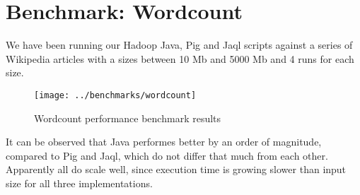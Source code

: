 \clearpage
\section{Benchmark: Wordcount}           

We have been running our Hadoop Java, Pig and Jaql scripts against a series of Wikipedia articles with a sizes between 10 Mb and 5000 Mb and 4 runs for each size.

\begin{figure}[H]
  \begin{center}
    \texttt{[image: ../benchmarks/wordcount]}
  \end{center}
  \caption{Wordcount performance benchmark results}
  \label{fig:reducers}
\end{figure}

It can be observed that Java performes better by an order of magnitude, compared to Pig and Jaql, which do not differ that much from each other. Apparently all do scale well, since execution time is growing slower than input size for all three implementations.